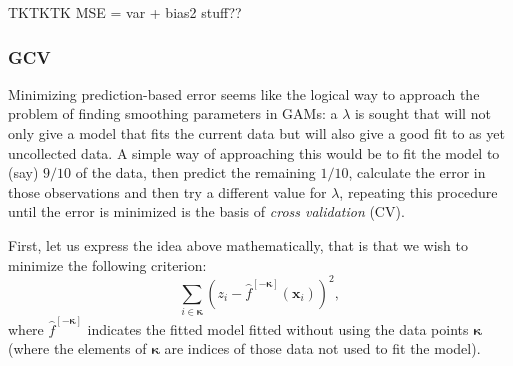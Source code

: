 TKTKTK MSE = var + bias2 stuff??

\subsubsection{GCV}

Minimizing prediction-based error seems like the logical way to approach the problem of finding smoothing parameters in GAMs: a $\lambda$ is sought that will not only give a model that fits the current  data but will also give a good fit to as yet uncollected data. A simple way of approaching this would be to fit the model to (say) $9/10$ of the data, then predict the remaining $1/10$, calculate the error in those observations and then try a different value for $\lambda$, repeating this procedure until the error is minimized is the basis of \textit{cross validation} (CV).

First, let us express the idea above mathematically, that is that we wish to minimize the following criterion:
\begin{equation*}
\sum_{i \in \bm{\kappa}} (z_i - \hat{f}^{[-\bm{\kappa}]}(\mathbf{x}_i))^2,
\end{equation*}
where $\hat{f}^{[-\bm{\kappa}]}$ indicates the fitted model fitted without using the data points $\bm{\kappa}$ (where the elements of $\bm{\kappa}$ are indices of those data not used to fit the model).

